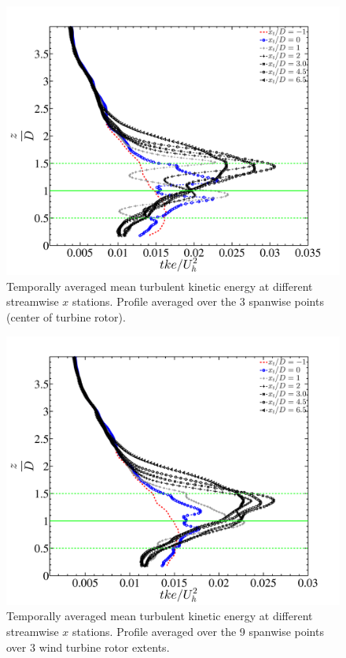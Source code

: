 \begin{figure}
\centering
\includegraphics[width = 0.8\linewidth]{stats/tkeprof_3points_avg.pdf}
\caption[Mean tke at $x$ stations 1]{Temporally averaged mean turbulent kinetic energy at different streamwise $x$ stations. Profile averaged over the  3 spanwise points (center of turbine rotor).}\label{fig:tkestat1}
\end{figure}
\begin{figure}
\centering
\includegraphics[width = 0.8\linewidth]{stats/tkeprof_9points_avg.pdf}
\caption[Mean tke at $x$ stations 2]{Temporally averaged mean turbulent kinetic energy at different streamwise $x$ stations. Profile averaged over the  9 spanwise points over 3 wind turbine rotor extents.}\label{fig:tkestat2}
\end{figure}
